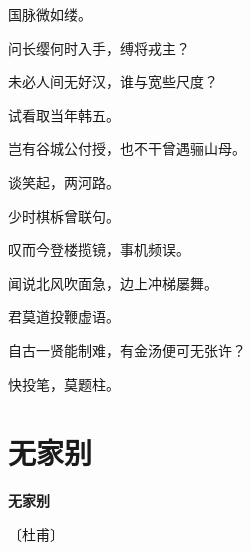 \documentclass[12pt,UTF-8,openany,fontset=none]{ctexbook}
\begin{document}
\begin{center}
    \begin{Large}

        国脉微如缕。

        问长缨何时入手，缚将戎主？

        未必人间无好汉，谁与宽些尺度？

        试看取当年韩五。

        岂有谷城公付授，也不干曾遇骊山母。

        谈笑起，两河路。

        \vspace{18pt}  %

        少时棋柝曾联句。

        叹而今登楼揽镜，事机频误。

        闻说北风吹面急，边上冲梯屡舞。

        君莫道投鞭虚语。

        自古一贤能制难，有金汤便可无张许？

        快投笔，莫题柱。

    \end{Large}

\end{center}

\vspace{8pt}
\clearpage

\section{无家别}


\begin{center}
    {\bfseries 无家别}

    \vspace{18pt}

    \begin{large}\xuwen
        〔杜甫〕
    \end{large}

\end{center}

    \vspace{18pt}  %
\end{document}
